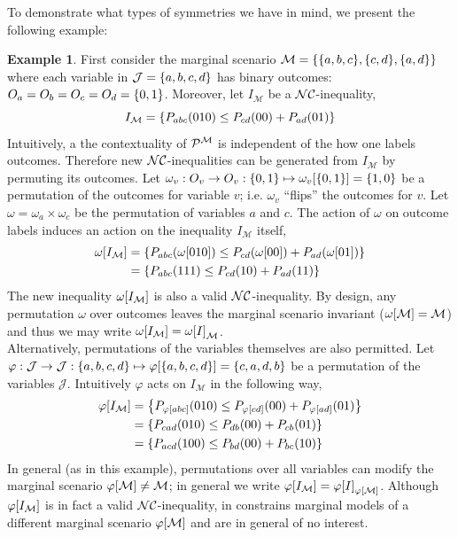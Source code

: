 \documentclass[aps, 10pt, english, twoside, pra, nofootinbib, longbibliography]{revtex4-1}
\theoremstyle{plain}
\theoremstyle{definition}
\newtheorem{example}[theorem]{Example}
\theoremstyle{remark}
\newcommand{\gep}{\varphi}
\newcommand{\geo}{\omega}
\newcommand{\mscenario}{\mathcal{M}}
\newcommand{\jointvar}{\mathcal{J}}
\begin{document}
    To demonstrate what types of symmetries we have in mind, we present the following example:
    \begin{example}
        \label{ex:symmetries}
        First consider the marginal scenario $\mscenario = \bc{\bc{a, b, c}, \bc{c, d}, \bc{a, d}}$ where each variable in $\jointvar = \bc{a,b,c,d}$ has binary outcomes: $O_a = O_b = O_c = O_d = \bc{0,1}$. Moreover, let $I_{\mscenario}$ be a $\mathcal{NC}$-inequality,
        \[ I_{\mscenario} = \bc{\prob[abc][010] \leq \prob[cd][00] + \prob[ad][01]}  \]
        Intuitively, a the contextuality of $\probvec^{\mscenario}$ is independent of the how one labels outcomes. Therefore new $\mathcal{NC}$-inequalities can be generated from $I_{\mscenario}$ by permuting its outcomes. Let $\geo_v : O_v \to O_v : \bc{0,1} \mapsto \geo_v\bs{\bc{0,1}} = \bc{1,0}$ be a permutation of the outcomes for variable $v$; i.e. $\geo_v$ ``flips'' the outcomes for $v$. Let $\geo = \geo_a \times \geo_c$ be the permutation of variables $a$ and $c$. The action of $\geo$ on outcome labels induces an action on the inequality $I_{\mscenario}$ itself,
        \begin{align*}
        \geo\bs{I_{\mscenario}} &= \bc{\prob[abc][\geo\bs{010}] \leq \prob[cd][\geo\bs{00}] + \prob[ad][\geo\bs{01}]} \\
        &= \bc{\prob[abc][111] \leq \prob[cd][10] + \prob[ad][11]}
        \end{align*}
        The new inequality $\geo\bs{I_{\mscenario}}$ is also a valid $\mathcal{NC}$-inequality. By design, any permutation $\geo$ over outcomes leaves the marginal scenario invariant ($\geo\bs{\mscenario} = \mscenario$) and thus we may write $\geo\bs{I_{\mscenario}} = \geo\bs{I}_{\mscenario}$. \\

        Alternatively, permutations of the variables themselves are also permitted. Let $\gep : \jointvar \to \jointvar : \bc{a,b,c,d} \mapsto \gep\bs{\bc{a,b,c,d}} = \bc{c,a,d,b}$ be a permutation of the variables $\jointvar$. Intuitively $\gep$ acts on $I_{\mscenario}$ in the following way,
        \begin{align*}
        \gep\bs{I_{\mscenario}} &= \bc{\prob[\gep\bs{abc}][010] \leq \prob[\gep\bs{cd}][00] + \prob[\gep\bs{ad}][01]} \\
        &= \bc{\prob[cad][010] \leq \prob[db][00] + \prob[cb][01]} \\
        &= \bc{\prob[acd][100] \leq \prob[bd][00] + \prob[bc][10]}
        \end{align*}
        In general (as in this example), permutations over all variables can modify the marginal scenario $\gep\bs{\mscenario} \neq \mscenario$; in general we write $\gep\bs{I_{\mscenario}} = \gep\bs{I}_{\gep\bs{\mscenario}}$. Although $\gep\bs{I_{\mscenario}}$ is in fact a valid $\mathcal{NC}$-inequality, in constrains marginal models of a different marginal scenario $\gep\bs{\mscenario}$ and are in general of no interest.
    \end{example}
\end{document}
